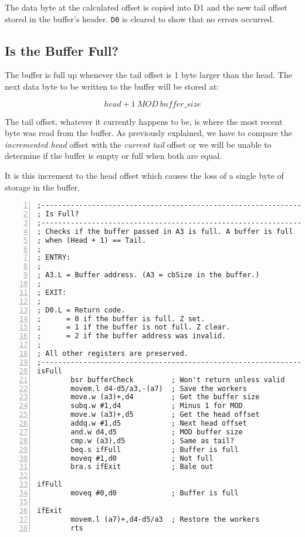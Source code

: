The data byte at the calculated offset is copied into D1 and the new
tail offset stored in the buffer's header. \texttt{D0} is cleared
to show that no errors occurred.

\subsection{Is the Buffer Full?}

The buffer is full up whenever the tail offset is 1 byte larger than
the head. The next data byte to be written to the buffer will be stored
at:

\[
head+1\ MOD\ buffer\_size
\]

The tail offset, whatever it currently happens to be, is where the
most recent byte was read from the buffer. As previously explained,
we have to compare the \emph{incremented head} offset with the \emph{current
tail} offset or we will be unable to determine if the buffer is empty
or full when both are equal.

It is this increment to the head offset which causes the loss of a
single byte of storage in the buffer.

\begin{lstlisting}[caption={Is buffer full},label={lis:Is-buffer-full},numbers=left,showstringspaces=false,tabsize=4]
;--------------------------------------------------------------
; Is Full?
;--------------------------------------------------------------
; Checks if the buffer passed in A3 is full. A buffer is full 
; when (Head + 1) == Tail.
; 
; ENTRY:
;
; A3.L = Buffer address. (A3 = cbSize in the buffer.)
;
; EXIT:
;
; D0.L = Return code.
;      = 0 if the buffer is full. Z set.
;      = 1 if the buffer is not full. Z clear.
;      = 2 if the buffer address was invalid.
;
; All other registers are preserved.
;--------------------------------------------------------------
isFull
        bsr bufferCheck         ; Won't return unless valid
        movem.l d4-d5/a3,-(a7)  ; Save the workers
        move.w (a3)+,d4         ; Get the buffer size
        subq.w #1,d4            ; Minus 1 for MOD
        move.w (a3)+,d5         ; Get the head offset
        addq.w #1,d5            ; Next head offset
        and.w d4,d5             ; MOD buffer size
        cmp.w (a3),d5           ; Same as tail?
        beq.s ifFull            ; Buffer is full
        moveq #1,d0             ; Not full
        bra.s ifExit            ; Bale out

ifFull        
        moveq #0,d0             ; Buffer is full

ifExit
        movem.l (a7)+,d4-d5/a3  ; Restore the workers
        rts

\end{lstlisting}

